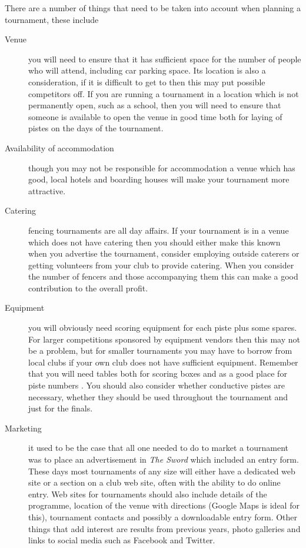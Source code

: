 \documentclass[a4paper,11pt]{memoir}
\begin{document}
There are a number of things that need to be taken into account when planning a tournament, these include
\begin{description}
 \item[Venue] you will need to ensure that it has sufficient space for the number of people who will attend, including car parking space. Its location is also a consideration, if it is difficult to get to then this may put possible competitors off. If you are running a tournament in a location which is not permanently open, such as a school, then you will need to ensure that someone is available to open the venue in good time both for laying of pistes on the days of the tournament.
 \item[Availability of accommodation] though you may not be responsible for accommodation a venue which has good, local hotels and boarding houses will make your tournament more attractive.
 \item[Catering] fencing tournaments are all day affairs. If your tournament is in a venue which does not have catering then you should either make this known when you advertise the tournament, consider employing outside caterers or getting volunteers from your club to provide catering. When you consider the number of fencers and those accompanying them this can make a good contribution to the overall profit.
 \item[Equipment] you will obviously need scoring equipment for each \gls{piste} plus some spares. For larger competitions sponsored by equipment vendors then this may not be a problem, but for smaller tournaments you may have to borrow from local clubs if your own club does not have sufficient equipment. Remember that you will need tables both for scoring boxes and as a good place for piste numbers . You should also consider whether conductive pistes are necessary, whether they should be used throughout the tournament and just for the finals.
 \item[Marketing] it used to be the case that all one needed to do to market a tournament was to place an advertisement in \emph{The Sword} which included an entry form. These days most tournaments of any size will either have a dedicated web site or a section on a club web site, often with the ability to do online entry. Web sites for tournaments should also include details of the programme, location of the venue with directions (Google Maps is ideal for this), tournament contacts and possibly a downloadable entry form. Other things that add interest are results from previous years, photo galleries and links to social media such as Facebook and Twitter. 

\end{description}
\end{document}
